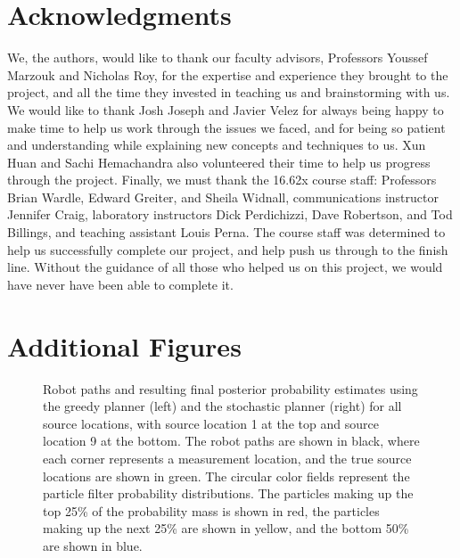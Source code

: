 \documentclass[submit, 12pt]{aiaa-pretty-modified}
\begin{document}
\section{Acknowledgments}
We, the authors, would like to thank our faculty advisors, Professors Youssef
Marzouk and Nicholas Roy, for the expertise and experience they brought to the
project, and all the time they invested in teaching us and brainstorming with
us. We would like to thank Josh Joseph and Javier Velez for always being happy
to make time to help us work through the issues we faced, and for being so
patient and understanding while explaining new concepts and techniques to us.
Xun Huan and Sachi Hemachandra also volunteered their time to help us progress
through the project. Finally, we must thank the 16.62x course staff: Professors
Brian Wardle, Edward Greiter, and Sheila Widnall, communications instructor
Jennifer Craig, laboratory instructors Dick Perdichizzi, Dave Robertson, and Tod
Billings, and teaching assistant Louis Perna. The course staff was determined to
help us successfully complete our project, and help push us through to the
finish line. Without the guidance of all those who helped us on this project, we
would have never have been able to complete it.


\newpage


\nocite{*}

\newpage
\appendix
\section{Additional Figures}
\begin{figure}
\begin{center}
\caption[Final posterior estimates for all trials]{
  Robot paths and resulting final posterior
  probability estimates using the greedy planner (left) and the
  stochastic planner (right) for all source locations, with source location 1
  at the top and source location 9 at the bottom. The
  robot paths are shown in black, where each corner represents a
  measurement location, and the true source locations are
  shown in green.  The circular color fields represent the particle
  filter probability distributions.  The particles making up the top 25\% of the
  probability mass is shown in red, the particles making up the next
  25\% are shown in yellow, and the bottom 50\% are shown in blue. }
\end{center}
\end{figure}
\end{document}
